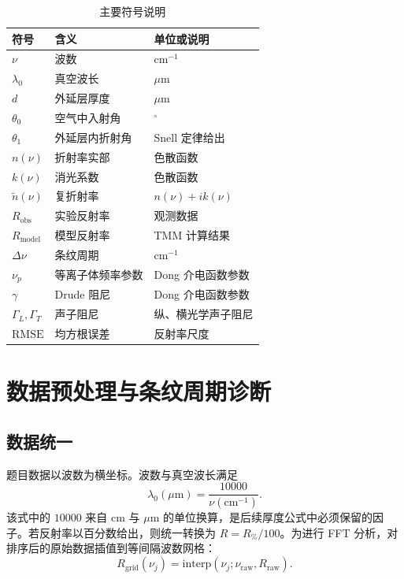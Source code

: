 \documentclass[UTF8,a4paper,12pt]{ctexart}
\newcommand{\um}{\ensuremath{\mu\mathrm{m}}}
\newcommand{\cmone}{\ensuremath{\mathrm{cm}^{-1}}}
\begin{document}
\begin{table}[H]
\centering
\caption{主要符号说明}
\begin{tabular}{lll}
\toprule
符号 & 含义 & 单位或说明\\
\midrule
$\nu$ & 波数 & $\cmone$\\
$\lambda_0$ & 真空波长 & $\um$\\
$d$ & 外延层厚度 & $\um$\\
$\theta_0$ & 空气中入射角 & $^\circ$\\
$\theta_1$ & 外延层内折射角 & Snell 定律给出\\
$n(\nu)$ & 折射率实部 & 色散函数\\
$k(\nu)$ & 消光系数 & 色散函数\\
$\tilde n(\nu)$ & 复折射率 & $n(\nu)+ik(\nu)$\\
$R_{\mathrm{obs}}$ & 实验反射率 & 观测数据\\
$R_{\mathrm{model}}$ & 模型反射率 & TMM 计算结果\\
$\Delta\nu$ & 条纹周期 & $\cmone$\\
$\nu_p$ & 等离子体频率参数 & Dong 介电函数参数\\
$\gamma$ & Drude 阻尼 & Dong 介电函数参数\\
$\Gamma_L,\Gamma_T$ & 声子阻尼 & 纵、横光学声子阻尼\\
$\mathrm{RMSE}$ & 均方根误差 & 反射率尺度\\
\bottomrule
\end{tabular}
\end{table}

\section{数据预处理与条纹周期诊断}

\subsection{数据统一}

题目数据以波数为横坐标。波数与真空波长满足
\begin{equation}
\lambda_0(\um)=\frac{10000}{\nu(\cmone)}.
\end{equation}
该式中的 $10000$ 来自 $\mathrm{cm}$ 与 $\um$ 的单位换算，是后续厚度公式中必须保留的因子。若反射率以百分数给出，则统一转换为 $R=R_{\%}/100$。为进行 FFT 分析，对排序后的原始数据插值到等间隔波数网格：
\begin{equation}
R_{\mathrm{grid}}(\nu_j)=
\mathrm{interp}\left(\nu_j;\nu_{\mathrm{raw}},R_{\mathrm{raw}}\right).
\end{equation}
\end{document}
